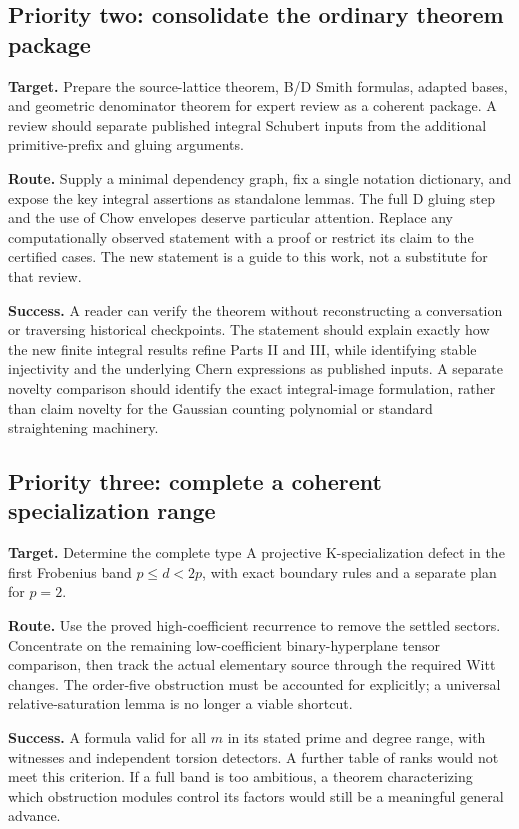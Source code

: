 \subsection{Priority two: consolidate the ordinary theorem package}
\textbf{Target.} Prepare the source-lattice theorem, B/D Smith formulas, adapted bases, and geometric denominator theorem for expert review as a coherent package. A review should separate published integral Schubert inputs from the additional primitive-prefix and gluing arguments.

\textbf{Route.} Supply a minimal dependency graph, fix a single notation dictionary, and expose the key integral assertions as standalone lemmas. The full D gluing step and the use of Chow envelopes deserve particular attention. Replace any computationally observed statement with a proof or restrict its claim to the certified cases. The new statement is a guide to this work, not a substitute for that review.

\textbf{Success.} A reader can verify the theorem without reconstructing a conversation or traversing historical checkpoints. The statement should explain exactly how the new finite integral results refine Parts II and III, while identifying stable injectivity and the underlying Chern expressions as published inputs. A separate novelty comparison should identify the exact integral-image formulation, rather than claim novelty for the Gaussian counting polynomial or standard straightening machinery.

\subsection{Priority three: complete a coherent specialization range}
\textbf{Target.} Determine the complete type A projective K-specialization defect in the first Frobenius band $p\le d<2p$, with exact boundary rules and a separate plan for $p=2$.

\textbf{Route.} Use the proved high-coefficient recurrence to remove the settled sectors. Concentrate on the remaining low-coefficient binary-hyperplane tensor comparison, then track the actual elementary source through the required Witt changes. The order-five obstruction must be accounted for explicitly; a universal relative-saturation lemma is no longer a viable shortcut.

\textbf{Success.} A formula valid for all $m$ in its stated prime and degree range, with witnesses and independent torsion detectors. A further table of ranks would not meet this criterion. If a full band is too ambitious, a theorem characterizing which obstruction modules control its factors would still be a meaningful general advance.

